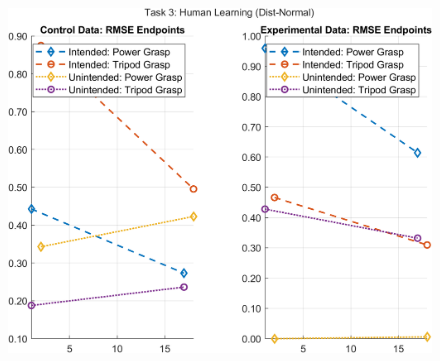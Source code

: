 \documentclass[12pt]{article}
\newcommand\figWidth{7in}
\begin{document}
\begin{figure}
    \includegraphics[width = \figWidth]{t3-spaghetti-dnorm.png}
\end{figure}
\end{document}
